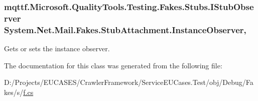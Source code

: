 \hypertarget{class_system_1_1_net_1_1_mail_1_1_fakes_1_1_stub_attachment_a0d98e640d4378af8054963d48221513a}{
\subsubsection[{Instance\-Observer}]{\setlength{\rightskip}{0pt plus 5cm}mqttf.\-Microsoft.\-Quality\-Tools.\-Testing.\-Fakes.\-Stubs.\-I\-Stub\-Observer System.\-Net.\-Mail.\-Fakes.\-Stub\-Attachment.\-Instance\-Observer\hspace{0.3cm}{\ttfamily [get]}, {\ttfamily [set]}}}\label{class_system_1_1_net_1_1_mail_1_1_fakes_1_1_stub_attachment_a0d98e640d4378af8054963d48221513a}


Gets or sets the instance observer.



The documentation for this class was generated from the following file\-:\begin{DoxyCompactItemize}
\item 
D\-:/\-Projects/\-E\-U\-C\-A\-S\-E\-S/\-Crawler\-Framework/\-Service\-E\-U\-Cases.\-Test/obj/\-Debug/\-Fakes/s/\hyperlink{s_2f_8cs}{f.\-cs}\end{DoxyCompactItemize}
